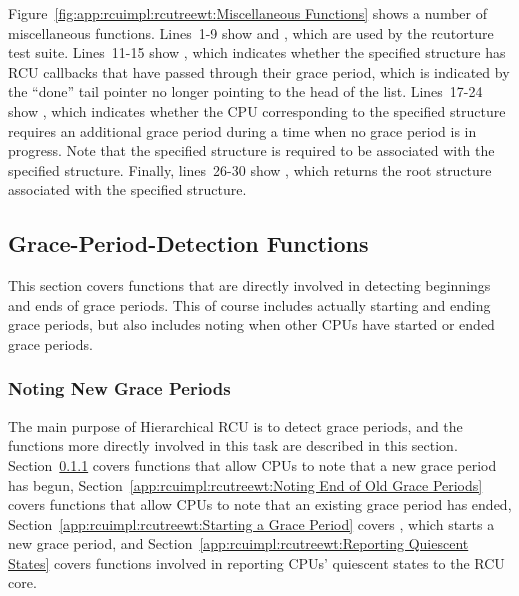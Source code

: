 Figure~\ref{fig:app:rcuimpl:rcutreewt:Miscellaneous Functions}
shows a number of miscellaneous functions.
Lines~1-9 show  and
, which are used by the rcutorture
test suite.
Lines~11-15 show , which
indicates whether the specified  structure has RCU
callbacks that have passed through their grace period, which
is indicated by the ``done'' tail pointer no longer pointing
to the head of the list.
Lines~17-24 show , which indicates
whether the CPU corresponding to the specified 
structure requires an additional grace period during a time when
no grace period is in progress.
Note that the specified  structure is required
to be associated with the specified  structure.
Finally, lines~26-30 show , which returns
the root  structure associated with the specified
 structure.
\fi

\subsection{Grace-Period-Detection Functions}
\label{app:rcuimpl:rcutreewt:Grace-Period-Detection Functions}

This section covers functions that are directly involved in detecting
beginnings and ends of grace periods.
This of course includes actually starting and ending grace periods,
but also includes noting when other CPUs have started or ended
grace periods.

\subsubsection{Noting New Grace Periods}
\label{app:rcuimpl:rcutreewt:Noting New Grace Periods}

The main purpose of Hierarchical RCU is to detect grace periods,
and the functions more directly involved in this task are described
in this section.
Section~\ref{app:rcuimpl:rcutreewt:Noting New Grace Periods}
covers functions that allow CPUs to note that a new grace period has
begun,
Section~\ref{app:rcuimpl:rcutreewt:Noting End of Old Grace Periods}
covers functions that allow CPUs to note that an existing grace period
has ended,
Section~\ref{app:rcuimpl:rcutreewt:Starting a Grace Period}
covers , which starts a new grace period, and
Section~\ref{app:rcuimpl:rcutreewt:Reporting Quiescent States}
covers functions involved in reporting CPUs' quiescent states to
the RCU core.


